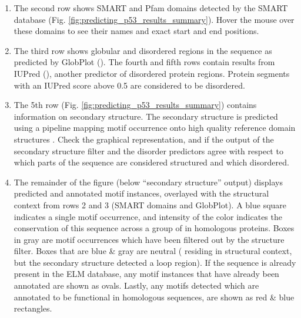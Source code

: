 \documentclass[12pt]{article}
\begin{document}
\begin{enumerate}
\item The second row shows SMART and Pfam domains detected by the SMART
	database \cite{9600884, 25300481, 9600884}
	(Fig. \ref{fig:predicting_p53_results_summary}). Hover the
	mouse over these domains to see their names and exact start and end
	positions.


\item The third row shows globular and disordered regions in the
	sequence as predicted by GlobPlot (\cite{12824398}). The fourth
	and fifth rows
	contain results from IUPred (\cite{15955779}), another
	predictor of disordered protein regions. Protein segments with
	an IUPred score above 0.5 are considered to be disordered.


\item The 5th row (Fig. \ref{fig:predicting_p53_results_summary}) contains
	information on secondary structure. The secondary structure is
	predicted using a pipeline mapping motif occurrence onto high quality
	reference domain structures \cite{19852836}. Check the graphical
	representation, and if the output of the secondary structure filter and
	the disorder predictors agree with respect to which parts of the
	sequence are considered structured and which disordered.

\item The remainder of the figure (below ``secondary structure'' output)
	displays predicted and annotated motif instances, overlayed with the
	structural context from rows 2 and 3 (SMART domains and GlobPlot). A
	blue square indicates a single motif occurrence, and intensity of the
	color indicates the conservation of this sequence across a group of in
	homologous proteins.
	Boxes in gray are motif occurrences which have been filtered out by the
	structure filter. Boxes that are blue \& gray are neutral (
	residing in structural context, but the secondary structure detected a
	loop region). If the sequence is already present in the ELM database,
	any motif instances that have already been annotated are shown as
	ovals. Lastly, any motifs detected which are annotated to be
	functional in homologous sequences, are shown as red \& blue
	rectangles.


\end{enumerate}
\end{document}
